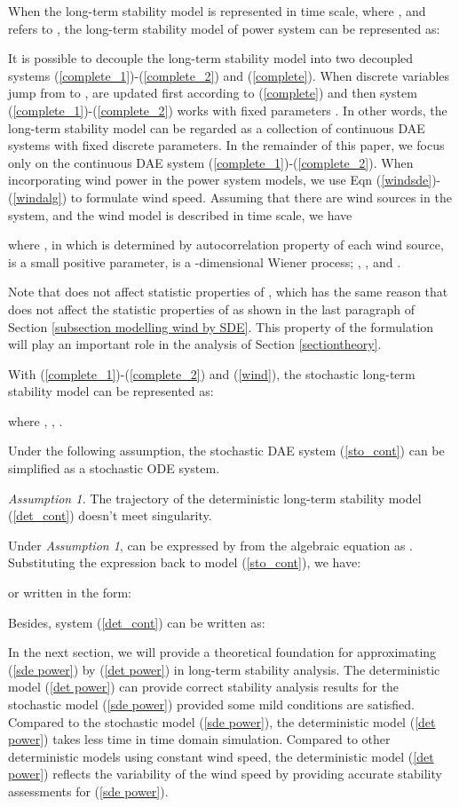 \documentclass[journal]{IEEEtran}
\begin{document}
When the long-term stability model is represented in  time scale, where , and  refers to , the long-term stability model of power system can be represented as:


It is possible to decouple the long-term stability model into two decoupled systems (\ref{complete_1})-(\ref{complete_2}) and (\ref{complete}). When discrete variables  jump from  to ,
 are updated first according to (\ref{complete}) and then system (\ref{complete_1})-(\ref{complete_2}) works with fixed parameters . In other words, the long-term stability model can be regarded as a collection of continuous DAE systems with fixed discrete parameters. In the remainder of this paper, we focus only on the continuous DAE system (\ref{complete_1})-(\ref{complete_2}). 
When incorporating wind power in the power system models, we use Eqn (\ref{windsde})-(\ref{windalg}) to formulate wind speed. Assuming that there are  wind sources in the system, and the wind model is described in  time scale, we have

where ,  in which  is determined by autocorrelation property of each wind source,  is a small positive parameter,  is a -dimensional Wiener process; , , and .

Note that  does not affect statistic properties of , which has the same reason that  does not affect the statistic properties of  as shown in the last paragraph of Section \ref{subsection modelling wind by SDE}. This property of the formulation will play an important role in the  analysis of Section \ref{sectiontheory}. 

With (\ref{complete_1})-(\ref{complete_2}) and (\ref{wind}), the stochastic long-term stability model can be represented as:

where , ,
.



Under the following assumption, the stochastic DAE system (\ref{sto_cont}) can be simplified as a stochastic ODE system.

\textit{Assumption 1.}
The trajectory of the deterministic long-term stability model (\ref{det_cont}) doesn't meet singularity.


Under \textit{Assumption 1},  can be expressed by  from the algebraic equation as . Substituting the expression back to model (\ref{sto_cont}), we have:

or written in the form:


Besides, system (\ref{det_cont}) can be written as:


In the next section, we will provide a theoretical foundation for approximating (\ref{sde power}) by (\ref{det power}) in long-term stability analysis. The deterministic model (\ref{det power}) can provide correct stability analysis results for the stochastic model (\ref{sde power}) provided some mild conditions are satisfied. Compared to the stochastic model (\ref{sde power}), the deterministic model (\ref{det power}) takes less time in time domain simulation. Compared to other deterministic models using constant wind speed, the deterministic model (\ref{det power}) reflects the variability of the wind speed by providing accurate stability assessments for (\ref{sde power}). 
\end{document}
